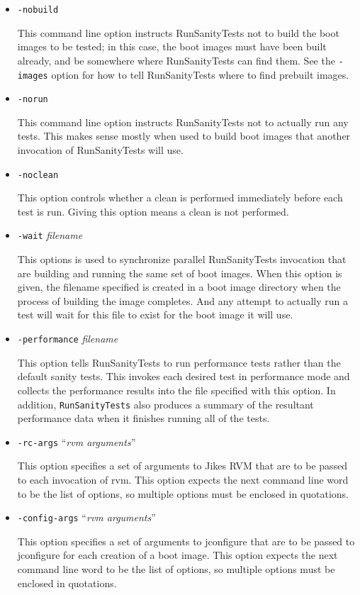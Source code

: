 \begin{itemize}
\item{\tt{-nobuild}}

 This command line option instructs RunSanityTests not to build the
boot images to be tested; in this case, the boot images must have been
built already, and be somewhere where RunSanityTests can find them.
See the {\tt -images} option for how to tell RunSanityTests where to
find prebuilt images.

\item{\tt{-norun}}

 This command line option instructs RunSanityTests not to actually run
any tests.  This makes sense mostly when used to build boot images
that another invocation of RunSanityTests will use.

\item{\tt{-noclean}}

 This option controls whether a clean is performed immediately before
each test is run.  Giving this option means a clean is not performed.

\item{\tt{-wait}} {\em filename}

 This options is used to synchronize parallel RunSanityTests invocation
that are building and running the same set of boot images.  When this
option is given, the filename specified is created in a boot image
directory when the process of building the image completes.  And any
attempt to actually run a test will wait for this file to exist for
the boot image it will use.

\item{\tt{-performance}} {\em filename}

 This option tells RunSanityTests to run performance tests rather than
the default sanity tests.  This invokes each desired test in
performance mode and collects the performance results into the file
specified with this option.  In addition, {\tt{RunSanityTests}} also
produces a summary of the resultant performance data when it finishes
running all of the tests.

\item{\tt{-rc-args}} ``{\em rvm arguments}''

 This option specifies a set of arguments to Jikes RVM that are to be
passed to each invocation of rvm.  This option expects the next
command line word to be the list of options, so multiple options must
be enclosed in quotations.

\item{\tt{-config-args}} ``{\em rvm arguments}''

 This option specifies a set of arguments to jconfigure that are to be
passed to jconfigure for each creation of a boot image.  This option
expects the next command line word to be the list of options, so
multiple options must be enclosed in quotations.

\end{itemize}

